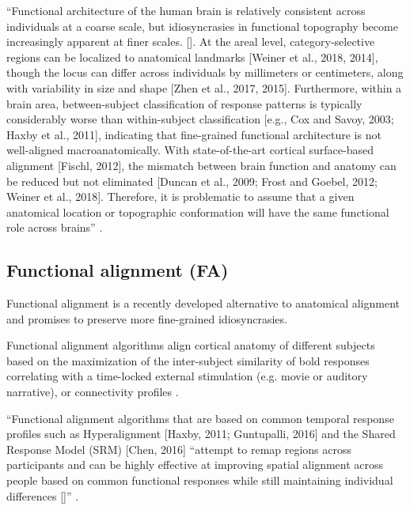 ``Functional architecture of the human brain is relatively consistent across
individuals at a coarse scale, but idiosyncrasies in functional topography
become increasingly apparent at finer scales. []. At the areal level,
category-selective regions can be localized to anatomical landmarks [Weiner et
al., 2018, 2014], though the locus can differ across individuals by millimeters
or centimeters, along with variability in size and shape [Zhen et al., 2017,
2015]. Furthermore, within a brain area, between-subject classification of
response patterns is typically considerably worse than within-subject
classification [e.g., Cox and Savoy, 2003; Haxby et al., 2011], indicating that
fine-grained functional architecture is not well-aligned macroanatomically. With
state-of-the-art cortical surface-based alignment [Fischl, 2012], the mismatch
between brain function and anatomy can be reduced but not eliminated [Duncan et
al., 2009; Frost and Goebel, 2012; Weiner et al., 2018]. Therefore, it is
problematic to assume that a given anatomical location or topographic
conformation will have the same functional role across brains''
\citep{feilong2018reliable}.


\subsection{Functional alignment (FA)}


Functional alignment is a recently developed alternative to anatomical alignment
and promises to preserve more fine-grained idiosyncrasies.

%
Functional alignment algorithms align cortical anatomy of different subjects
based on the maximization of the inter-subject similarity of \ac{bold} responses
\citep{haxby2011common, chen2015reduced, sabuncu2010function} correlating with a
time-locked external stimulation (e.g. movie or auditory narrative), or
connectivity profiles \citep{feilong2018reliable, guntupalli2018computational}.

%
``Functional alignment algorithms that are based on common temporal response
profiles such as Hyperalignment [Haxby, 2011; Guntupalli, 2016] and the Shared
Response Model (SRM) [Chen, 2016] ``attempt to remap regions across participants
and can be highly effective at improving spatial alignment across people based
on common functional responses while still maintaining individual differences
[\citep{feilong2018reliable}]'' \citep{chang2021endogenous}.

